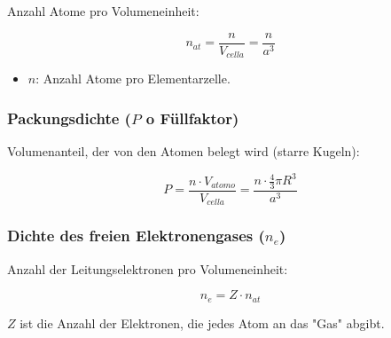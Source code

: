 Anzahl Atome pro Volumeneinheit:

\begin{minipage}{0.4\columnwidth}
	$$n_{at} = \frac{n}{V_{cella}} = \frac{n}{a^3}$$
\end{minipage}
\begin{minipage}{0.6\columnwidth}
	\begin{itemize}
		\item $n$: Anzahl Atome pro Elementarzelle.
	\end{itemize}
\end{minipage}

\subsubsection{Packungsdichte ($P$ o Füllfaktor)}

Volumenanteil, der von den Atomen belegt wird (starre Kugeln):

$$P = \frac{n \cdot V_{atomo}}{V_{cella}} = \frac{n \cdot \frac{4}{3}\pi R^3}{a^3}$$


\subsubsection{Dichte des freien Elektronengases ($n_e$)}
Anzahl der Leitungselektronen pro Volumeneinheit:

$$n_e = Z \cdot n_{at}$$

$Z$ ist die Anzahl der Elektronen, die jedes Atom an das "Gas" abgibt.

